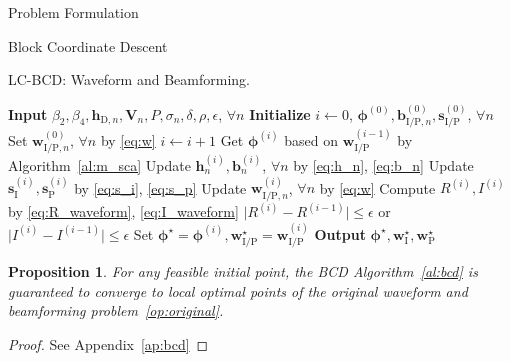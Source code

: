 \documentclass[journal]{IEEEtran}
\newtheorem{proposition}{Proposition}
\begin{document}
\begin{section}{Problem Formulation}
\begin{subsection}{Block Coordinate Descent}
			\begin{algorithm}[!t]
				\caption{LC-BCD: Waveform and Beamforming.}
				\label{al:lc_bcd}
				\begin{algorithmic}[1]
					\State \textbf{Input} $\beta_2,\beta_4,\boldsymbol{h}_{\mathrm{D},n},\boldsymbol{V}_{n},P,\sigma_n,\delta,\rho,\epsilon$, $\forall n$
					\State \textbf{Initialize} $i \gets 0$, $\boldsymbol{\phi}^{(0)},\boldsymbol{b}_{\mathrm{I/P},n}^{(0)},\boldsymbol{s}_{\mathrm{I/P}}^{(0)}$, $\forall n$
					\State Set $\boldsymbol{w}_{\mathrm{I/P},n}^{(0)}$, $\forall n$ by \eqref{eq:w}
					\Repeat
						\State $i \gets i + 1$
						\State Get $\boldsymbol{\phi}^{(i)}$ based on $\boldsymbol{w}_{\mathrm{I/P}}^{(i-1)}$ by Algorithm~\ref{al:m_sca}
						\State Update $\boldsymbol{h}_n^{(i)},\boldsymbol{b}_n^{(i)}$, $\forall n$ by \eqref{eq:h_n}, \eqref{eq:b_n}
						\State Update $\boldsymbol{s}_{\mathrm{I}}^{(i)},\boldsymbol{s}_{\mathrm{P}}^{(i)}$ by \eqref{eq:s_i}, \eqref{eq:s_p}
						\State Update $\boldsymbol{w}_{\mathrm{I/P},n}^{(i)}$, $\forall n$ by \eqref{eq:w}
						\State Compute $R^{(i)},I^{(i)}$ by \eqref{eq:R_waveform}, \eqref{eq:I_waveform}
					\Until $\lvert R^{(i)} - R^{(i-1)} \rvert \le \epsilon$ or $\lvert I^{(i)} - I^{(i-1)} \rvert \le \epsilon$
					\State Set $\boldsymbol{\phi}^{\star}=\boldsymbol{\phi}^{(i)},\boldsymbol{w}_{\mathrm{I/P}}^{\star}=\boldsymbol{w}_{\mathrm{I/P}}^{(i)}$
					\State \textbf{Output} $\boldsymbol{\phi}^{\star},\boldsymbol{w}_{\mathrm{I}}^{\star},\boldsymbol{w}_{\mathrm{P}}^{\star}$
				\end{algorithmic}
			\end{algorithm}

			\begin{proposition}\label{pr:bcd}
				For any feasible initial point, the BCD Algorithm~\ref{al:bcd} is guaranteed to converge to local optimal points of the original waveform and beamforming problem~\eqref{op:original}.
			\end{proposition}

			\begin{proof}\label{pf:bcd}
				See Appendix~\ref{ap:bcd}
			\end{proof}
		\end{subsection}
	\end{section}
\end{document}
